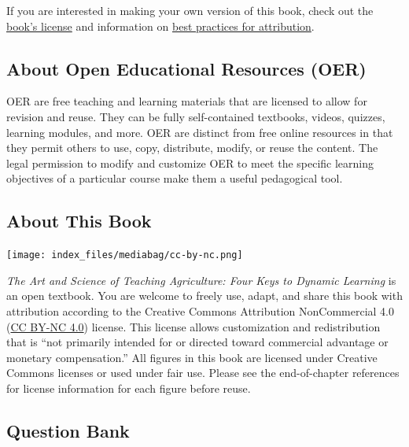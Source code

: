 \documentclass[
  letterpaper,
  DIV=11,
  numbers=noendperiod]{scrreprt}
\begin{document}
If you are interested in making your own version of this book, check out
the \href{https://creativecommons.org/licenses/by-nc/4.0/deed.en}{book's
license} and information on
\href{https://wiki.creativecommons.org/wiki/Best_practices_for_attribution}{best
practices for attribution}.

\subsection*{\texorpdfstring{\textbf{About Open Educational Resources
(OER)}}{About Open Educational Resources (OER)}}\label{about-open-educational-resources-oer}

OER are free teaching and learning materials that are licensed to allow
for revision and reuse. They can be fully self-contained textbooks,
videos, quizzes, learning modules, and more. OER are distinct from free
online resources in that they permit others to use, copy, distribute,
modify, or reuse the content. The legal permission to modify and
customize OER to meet the specific learning objectives of a particular
course make them a useful pedagogical tool.

\subsection*{\texorpdfstring{\textbf{About This
Book}}{About This Book}}\label{about-this-book}

\texttt{[image: index\_files/mediabag/cc-by-nc.png]}

\emph{The Art and Science of Teaching Agriculture: Four Keys to Dynamic
Learning} is an open textbook. You are welcome to freely use, adapt, and
share this book with attribution according to the Creative Commons
Attribution NonCommercial 4.0
(\href{https://creativecommons.org/licenses/by-nc/4.0/deed.en}{CC BY-NC
4.0}) license. This license allows customization and redistribution that
is ``not primarily intended for or directed toward commercial advantage
or monetary compensation.'' All figures in this book are licensed under
Creative Commons licenses or used under fair use. Please see the
end-of-chapter references for license information for each figure before
reuse.

\subsection*{\texorpdfstring{\textbf{Question
Bank}}{Question Bank}}\label{question-bank}
\end{document}
